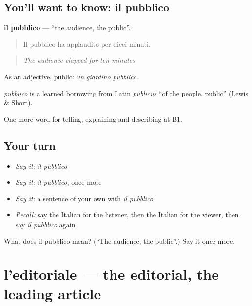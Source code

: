 \subsection*{You'll want to know: il pubblico}
\textbf{il pubblico} — \textquotedblleft{}the audience, the public\textquotedblright{}.

\begin{quote}
Il pubblico ha applaudito per dieci minuti.
\end{quote}

\begin{quote}
\emph{The audience clapped for ten minutes.}
\end{quote}

As an adjective, public: \emph{un giardino pubblico}.

\begin{cousinweb}
\emph{pubblico} is a learned borrowing from Latin \emph{pūblicus} \textquotedblleft{}of the people, public\textquotedblright{} (Lewis \& Short).
\end{cousinweb}

\begin{grammarlens}[title={What you've built}]
One more word for telling, explaining and describing at B1.
\end{grammarlens}

\subsection*{Your turn}
\begin{itemize}
\raggedright
  \item \emph{Say it:} \emph{il pubblico}
  \item \emph{Say it:} \emph{il pubblico}, once more
  \item \emph{Say it:} a sentence of your own with \emph{il pubblico}
  \item \emph{Recall:} say the Italian for the listener, then the Italian for the viewer, then say \emph{il pubblico} again
\end{itemize}

\begin{tcolorbox}[breakable,colback=teal!4,colframe=teal!35!black,title={Before you move on}]
What does il pubblico mean? (\textquotedblleft{}The audience, the public\textquotedblright{}.) Say it once more.
\end{tcolorbox}
\section[l'editoriale]{l'editoriale — the editorial, the leading article}

